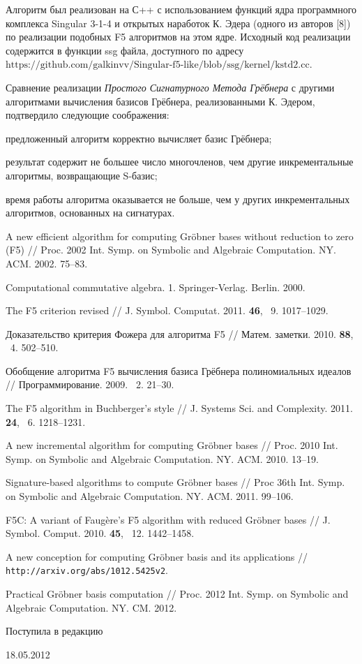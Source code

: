 \documentclass[russian,11pt,twoside]{article}
\begin{document}
Алгоритм был реализован на С++ с использованием функций ядра программного
комплекса Singular 3-1-4 и открытых наработок К. Эдера (одного из
авторов {[}8{]}) по реализации подобных F5 алгоритмов на этом ядре.
Исходный код реализации содержится в функции ssg файла, доступного
по адресу \texttt{$\mbox{https://github.com/galkinvv/Singular-f5-like/blob/ssg/kernel/kstd2.cc}$}.

Сравнение реализации \emph{Простого Сигнатурного Метода Грёбнера}
с другими алгоритмами вычисления базисов Грёбнера, реализованными
К. Эдером, подтвердило следующие соображения:

предложенный алгоритм корректно вычисляет базис Грёбнера;

результат содержит не большее число многочленов, чем другие инкрементальные
алгоритмы, возвращающие S-базис;

время работы алгоритма оказывается не больше, чем у других инкрементальных
алгоритмов, основанных на сигнатурах.

\newpage
\spisoklit
\small{}
 A new efficient algorithm for computing Gr\"{o}bner bases without reduction to zero (F5) // Proc. 2002 Int. Symp. on Symbolic and Algebraic Computation. NY. ACM. 2002. 75--83.

 Computational commutative algebra. 1. Springer-Verlag. Berlin. 2000.

 The F5 criterion revised // J. Symbol. Computat. 2011. {\bf46}, \No~9. 1017--1029.

 Доказательство критерия Фожера для алгоритма F5 // Матем. заметки. 2010. {\bf88}, \No~4. 502--510.

 Обобщение алгоритма F5 вычисления базиса Грёбнера полиномиальных идеалов // Программирование. 2009. \No~2. 21--30.

 The F5 algorithm in Buchberger’s style // J. Systems Sci. and Complexity. 2011. {\bf24}, \No~6. 1218--1231. 

 A new incremental algorithm for computing Gr\"{o}bner bases // Proc.  2010 Int. Symp. on Symbolic and Algebraic Computation. NY. ACM. 2010. 13--19.

 Signature-based algorithms to compute Gr\"{o}bner bases // Proc 36th Int. Symp. on Symbolic and Algebraic Computation. NY. ACM. 2011. 99--106.

 F5C: A variant of Faug\`{e}re's F5 algorithm with reduced Gr\"{o}bner bases // J. Symbol. Comput. 2010. {\bf45}, \No~12. 1442--1458.

 A new conception for computing Gr\"{o}bner basis and its applications //  \texttt{http://arxiv.org/abs/1012.5425v2}.

 Practical Gr\"{o}bner basis computation // Proc. 2012 Int. Symp. on Symbolic and Algebraic Computation. NY. CM. 2012.

\hspace{0.75\textwidth}Поступила в редакцию

\hspace{0.75\textwidth}18.05.2012

\lend
\end{document}
